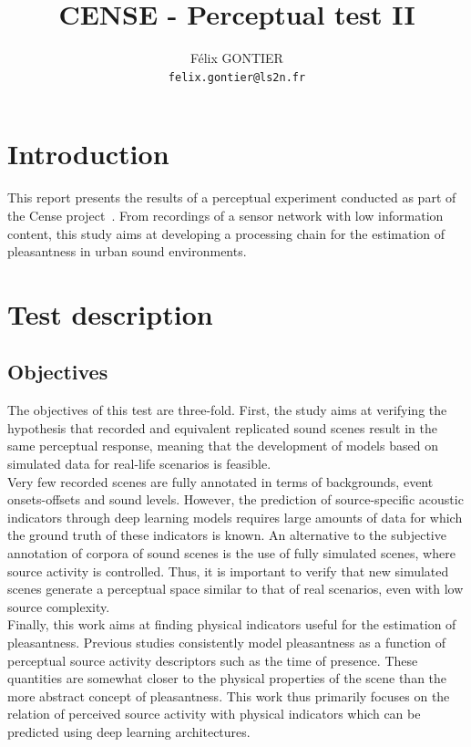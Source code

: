 \documentclass[11pt,a4paper]{article}
\begin{document}
\author{F\'elix GONTIER \\ \texttt{felix.gontier@ls2n.fr}}
\title{CENSE - Perceptual test II}
\maketitle

\section{Introduction}

This report presents the results of a perceptual experiment conducted as part of the Cense project~\cite{cense}. From recordings of a sensor network with low information content, this study aims at developing a processing chain for the estimation of pleasantness in urban sound environments.

\section{Test description}
\subsection{Objectives}
\label{sec:test_obj}

The objectives of this test are three-fold. First, the study aims at verifying the hypothesis that recorded and equivalent replicated sound scenes result in the same perceptual response, meaning that the development of models based on simulated data for real-life scenarios is feasible.\\

Very few recorded scenes are fully annotated in terms of backgrounds, event onsets-offsets and sound levels. However, the prediction of source-specific acoustic indicators through deep learning models requires large amounts of data for which the ground truth of these indicators is known. An alternative to the subjective annotation of corpora of sound scenes is the use of fully simulated scenes, where source activity is controlled. Thus, it is important to verify that new simulated scenes generate a perceptual space similar to that of real scenarios, even with low source complexity.\\

Finally, this work aims at finding physical indicators useful for the estimation of pleasantness. Previous studies consistently model pleasantness as a function of perceptual source activity descriptors such as the time of presence. These quantities are somewhat closer to the physical properties of the scene than the more abstract concept of pleasantness. This work thus primarily focuses on the relation of perceived source activity with physical indicators which can be predicted using deep learning architectures.
\end{document}
